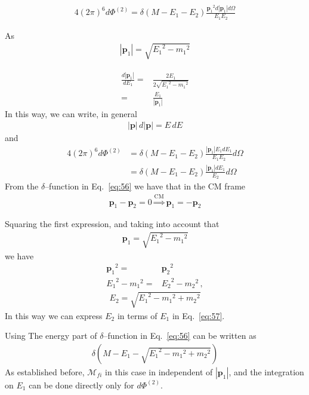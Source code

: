 \begin{align}
  4(2\pi)^6d\Phi^{(2)}=\delta(M-E_1-E_2)
  \frac{{\mathbf{p}_1}^2d|\mathbf{p}_1|d\Omega}{E_{1}E_{2}}
\end{align}

As
\begin{align}
  |\mathbf{p}_1|=\sqrt{{E_1}^2-{m_1}^2}
\end{align}

\begin{align}
  \frac{d|\mathbf{p}_1|}{dE_1}=&\frac{2E_1}{2\sqrt{{E_1}^2-{m_1}^2}}\nonumber\\
  =&\frac{E_1}{|\mathbf{p}_1|}
\end{align}
In this way, we can write, in general
\begin{align}
 |\mathbf{p}|\, d|\mathbf{p}|=E\,dE
\end{align}
and
\begin{align}
 4(2\pi)^6 d\Phi^{(2)}&=\delta(M-E_1-E_2)
\frac{|\mathbf{p}_1|E_1dE_1}{E_{1}E_{2}}d\Omega\nonumber\\
  &=\delta(M-E_1-E_2)
\frac{|\mathbf{p}_1|dE_1}{E_{2}}d\Omega
\end{align}
From the $\delta$--function in Eq.~\eqref{eq:56} we have that in the CM frame
\begin{align}
 \mathbf{p}_1-\mathbf{p}_2=0 \overset{\text{CM}}{\Rightarrow}
    \mathbf{p}_1=-\mathbf{p}_2
\end{align}

Squaring the first expression, and taking into account that
\begin{align}
  {\mathbf{p}_1}= \sqrt{{E_1}^2-{m_1}^2}
\end{align}
we have
\begin{align}
  {\mathbf{p}_1}^2=&{\mathbf{p}_2}^2\nonumber\\
  {E_1}^2-{m_1}^2=&  {E_2}^2-{m_2}^2\,,
\end{align}
\begin{align}
  E_2=\sqrt{{E_1}^2-{m_1}^2+{m_2}^2}
\end{align}
In this way we can express $E_2$ in terms of $E_1$ in Eq.~\eqref{eq:57}.

Using The energy part of $\delta$--function in Eq.~\eqref{eq:56} can be written as
\begin{align}
  \delta\left(M-E_1-\sqrt{{E_1}^2-{m_1}^2+{m_2}^2}\right)
\end{align}
As established before,  $\mathcal{M}_{fi}$ in this case in independent of $|\mathbf{p}_1|$, and the integration on $E_1$ can be done directly only for $d\Phi^{(2)}$.

